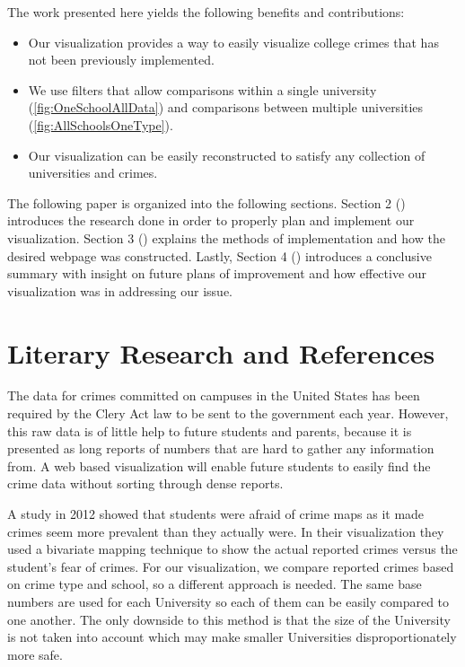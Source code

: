 \documentclass[journal]{vgtc}                %
\begin{document}
\newline
\newline
\newline
The work presented here yields the following benefits and contributions:
\begin{itemize}
\setlength\itemsep{0em}
\item Our visualization provides a way to easily visualize college crimes that has not been previously implemented.
\item We use filters that allow comparisons within a single university (\autoref{fig:OneSchoolAllData}) and comparisons between multiple universities (\autoref{fig:AllSchoolsOneType}).
\item Our visualization can be easily reconstructed to satisfy any collection of universities and crimes.
\end{itemize}
\indent The following paper is organized into the following sections.  Section 2 () introduces the research done in order to properly plan and implement our visualization. Section 3 () explains the methods of implementation and how the desired webpage was constructed. Lastly, Section 4 () introduces a conclusive summary with insight on future plans of improvement and how effective our visualization was in addressing our issue.\\

\section{Literary Research and References} \label{research}
The data for crimes committed on campuses in the United States has been required by the Clery Act law to be sent to the government each year.  However, this raw data is of little help to future students and parents, because it is presented as long reports of numbers that are hard to gather any information from\cite{lipka-2011}.  A web based visualization will enable future students to easily find the crime data without sorting through dense reports.

A study in 2012 showed that students were afraid of crime maps as it made crimes seem more prevalent than they actually were\cite{fuhrmann-huynh-scholz-2013}. In their visualization they used a bivariate mapping technique to show the actual reported crimes versus the student’s fear of crimes.  For our visualization, we compare reported crimes based on crime type and school, so a different approach is needed.  The same base numbers are used for each University so each of them can be easily compared to one another.  The only downside to this method is that the size of the University is not taken into account which may make smaller Universities disproportionately more safe.
\end{document}
